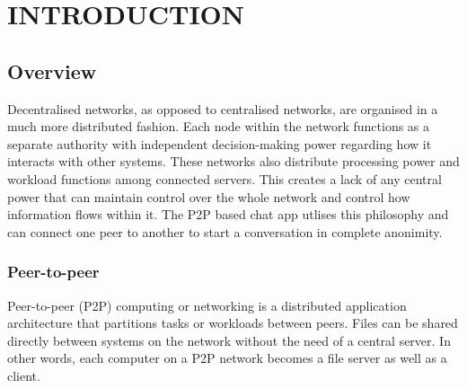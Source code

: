 \documentclass{fisatproject}
\begin{document}
\restoregeometry
\tableofcontents

\newpage
\pagestyle{fancy}


\chapter{INTRODUCTION}
\setcounter{page}{1}
\renewcommand{\baselinestretch}{1.50}
\section{Overview}
Decentralised networks, as opposed to centralised networks, are organised in a much more distributed fashion. Each node within the network functions as a separate authority with independent decision-making power regarding how it interacts with other systems. These networks also distribute processing power and workload functions among connected servers. This creates a lack of any central power that can maintain control over the whole network and control how information flows within it. The P2P based chat app utlises this philosophy and can connect one peer to another to start a conversation in complete anonimity.

	\subsection{Peer-to-peer}
	Peer-to-peer (P2P) computing or networking is a distributed application architecture that partitions tasks or workloads between peers. Files can be shared directly between systems on the network without the need of a central server. In other words, each computer on a P2P network becomes a file server as well as a client.
	
\end{document}

